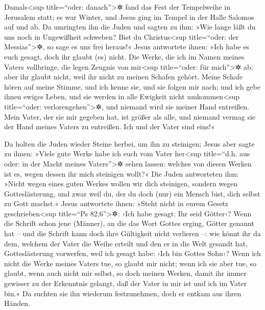  Damals\textless sup title=``oder: danach''\textgreater✲
fand das Fest der Tempelweihe in Jerusalem statt; es war Winter,
 und Jesus ging im Tempel in der Halle Salomos auf und
ab.  Da umringten ihn die Juden und sagten zu ihm: »Wie
lange läßt du uns noch in Ungewißheit schweben? Bist du
Christus\textless sup title=``oder: der Messias''\textgreater✲, so sage
es uns frei heraus!«  Jesus antwortete ihnen: »Ich habe
es euch gesagt, doch ihr glaubt (es) nicht. Die Werke, die ich im Namen
meines Vaters vollbringe, die legen Zeugnis von mir\textless sup
title=``oder: für mich''\textgreater✲ ab;  aber ihr
glaubt nicht, weil ihr nicht zu meinen Schafen gehört. 
Meine Schafe hören auf meine Stimme, und ich kenne sie, und sie folgen
mir nach;  und ich gebe ihnen ewiges Leben, und sie
werden in alle Ewigkeit nicht umkommen\textless sup title=``oder:
verlorengehen''\textgreater✲, und niemand wird sie meiner Hand
entreißen.  Mein Vater, der sie mir gegeben hat, ist
größer als alle, und niemand vermag sie der Hand meines Vaters zu
entreißen.  Ich und der Vater sind eins!«

 Da holten die Juden wieder Steine herbei, um ihn zu
steinigen;  Jesus aber sagte zu ihnen: »Viele gute Werke
habe ich euch vom Vater her\textless sup title=``d.h. aus oder: in der
Macht meines Vaters''\textgreater✲ sehen lassen: welches von diesen
Werken ist es, wegen dessen ihr mich steinigen wollt?« 
Die Juden antworteten ihm: »Nicht wegen eines guten Werkes wollen wir
dich steinigen, sondern wegen Gotteslästerung, und zwar weil du, der du
doch (nur) ein Mensch bist, dich selbst zu Gott machst.« 
Jesus antwortete ihnen: »Steht nicht in eurem Gesetz
geschrieben\textless sup title=``Ps 82,6''\textgreater✲: ›Ich habe
gesagt: Ihr seid Götter‹?  Wenn die Schrift schon jene
(Männer), an die das Wort Gottes erging, Götter genannt hat -- und die
Schrift kann doch ihre Gültigkeit nicht verlieren --: 
wie könnt ihr da dem, welchem der Vater die Weihe erteilt und den er in
die Welt gesandt hat, Gotteslästerung vorwerfen, weil ich gesagt habe:
›Ich bin Gottes Sohn‹?  Wenn ich nicht die Werke meines
Vaters tue, so glaubt mir nicht;  wenn ich sie aber tue,
so glaubt, wenn auch nicht mir selbst, so doch meinen Werken, damit ihr
immer gewisser zu der Erkenntnis gelangt, daß der Vater in mir ist und
ich im Vater bin.«  Da suchten sie ihn wiederum
festzunehmen, doch er entkam aus ihren Händen.

